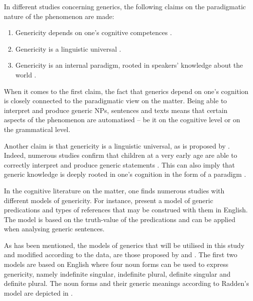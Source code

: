 \documentclass[output=paper]{langsci/langscibook}
\begin{document}
In different studies concerning generics, the following claims on the paradigmatic nature of the phenomenon are made:

\begin{enumerate}
    \item Genericity depends on one's cognitive competences \citep[35]{Collins2018}.
    \item Genericity is a linguistic universal \citep[381]{Leslie2007}.
    \item Genericity is an internal paradigm, rooted in speakers' knowledge about the world \citep{Gelman-Tardif1998,Leslie-etal2011}.
\end{enumerate}

When it comes to the first claim, the fact that generics depend on one's cognition is closely connected to the paradigmatic view on the matter. Being able to interpret and produce generic NPs, sentences and texts means that certain aspects of the phenomenon are automatised -- be it on the cognitive level or on the grammatical level.

Another claim is that genericity is a linguistic universal, as is proposed by \citet{Leslie2007}. Indeed, numerous studies confirm that children at a very early age are able to correctly interpret and produce generic statements \citep{Gelman-Tardif1998}. This can also imply that generic knowledge is deeply rooted in one's cognition in the form of a paradigm \citep{Leslie-etal2011}.

In the cognitive literature on the matter, one finds numerous studies with different models of genericity. For instance, \citet{Leslie-etal2011} present a model of generic predications and types of references that may be construed with them in English. The model is based on the truth-value of the predications and can be applied when analysing generic sentences.

As has been mentioned, the models of generics that will be utilised in this study and modified according to the data, are those proposed by \citet{Radden2007,Radden2009} and \citet{Pettersson1976}. The first two models are based on English where four noun forms can be used to express genericity, namely indefinite singular, indefinite plural, definite singular and definite plural. The noun forms and their generic meanings according to Radden's model are depicted in .
\end{document}
